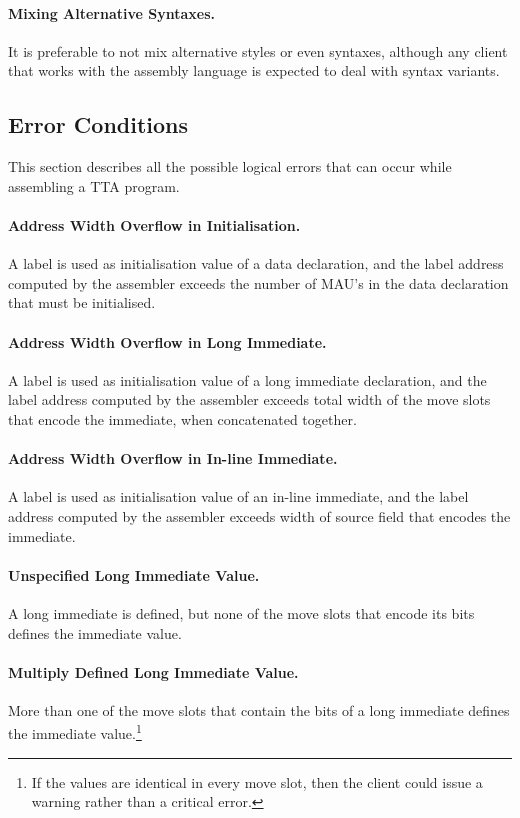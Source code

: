 \documentclass[twoside]{tceusermanual}
\begin{document}
\paragraph{Mixing Alternative Syntaxes.}
It is preferable to not mix alternative styles or even syntaxes, although
any client that works with the assembly language is expected to deal with
syntax variants.

\subsection{Error Conditions}
\label{ssec:errors}

This section describes all the possible logical errors that can occur while
assembling a TTA program.

\paragraph{Address Width Overflow in Initialisation.}
A label is used as initialisation value of a data declaration, and the label
address computed by the assembler exceeds the number of MAU's in the data
declaration that must be initialised.

\paragraph{Address Width Overflow in Long Immediate.}
A label is used as initialisation value of a long immediate declaration, and
the label address computed by the assembler exceeds total width of the move
slots that encode the immediate, when concatenated together.

\paragraph{Address Width Overflow in In-line Immediate.}
A label is used as initialisation value of an in-line immediate, and the
label address computed by the assembler exceeds width of source field that
encodes the immediate.

\paragraph{Unspecified Long Immediate Value.}
A long immediate is defined, but none of the move slots that encode its bits
defines the immediate value.

\paragraph{Multiply Defined Long Immediate Value.}
More than one of the move slots that contain the bits of a long immediate
defines the immediate value.\footnote{
%
  If the values are identical in every move slot, then the client could
  issue a warning rather than a critical error.}
\end{document}
